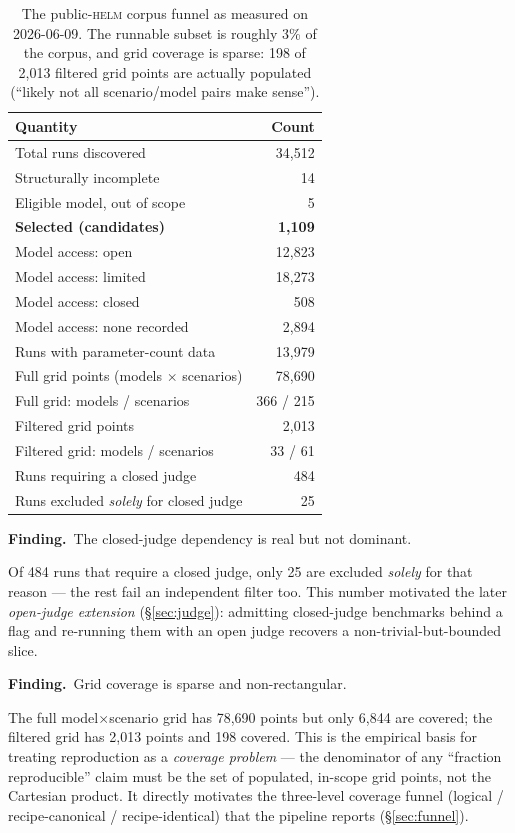 \documentclass[11pt]{report}
\newcommand{\finding}[1]{\par\noindent\textbf{Finding.}~#1\par}
\begin{document}
\begin{table}[H]
\centering
\begin{tabular}{lr}
\toprule
\textbf{Quantity} & \textbf{Count} \\
\midrule
Total runs discovered            & 34{,}512 \\
Structurally incomplete          & 14 \\
Eligible model, out of scope     & 5 \\
\textbf{Selected (candidates)}   & \textbf{1{,}109} \\
\midrule
Model access: open               & 12{,}823 \\
Model access: limited            & 18{,}273 \\
Model access: closed             & 508 \\
Model access: none recorded      & 2{,}894 \\
\midrule
Runs with parameter-count data   & 13{,}979 \\
\midrule
Full grid points (models $\times$ scenarios) & 78{,}690 \\
Full grid: models / scenarios    & 366 / 215 \\
Filtered grid points             & 2{,}013 \\
Filtered grid: models / scenarios & 33 / 61 \\
\midrule
Runs requiring a closed judge    & 484 \\
Runs excluded \emph{solely} for closed judge & 25 \\
\bottomrule
\end{tabular}
\caption{The public-\textsc{helm} corpus funnel as measured on 2026-06-09. The
runnable subset is roughly 3\% of the corpus, and grid coverage is sparse: 198
of 2{,}013 filtered grid points are actually populated (``likely not all
scenario/model pairs make sense'').}
\label{tab:corpusstats}
\end{table}

\finding{The closed-judge dependency is real but not dominant.} Of 484 runs that
require a closed judge, only 25 are excluded \emph{solely} for that reason --- the
rest fail an independent filter too. This number motivated the later
\emph{open-judge extension} (\S\ref{sec:judge}): admitting closed-judge benchmarks
behind a flag and re-running them with an open judge recovers a
non-trivial-but-bounded slice.

\finding{Grid coverage is sparse and non-rectangular.} The full model$\times$scenario
grid has 78{,}690 points but only 6{,}844 are covered; the filtered grid has 2{,}013
points and 198 covered. This is the empirical basis for treating reproduction as a
\emph{coverage problem} --- the denominator of any ``fraction reproducible'' claim
must be the set of populated, in-scope grid points, not the Cartesian product. It
directly motivates the three-level coverage funnel (logical / recipe-canonical /
recipe-identical) that the pipeline reports (\S\ref{sec:funnel}).
\end{document}
